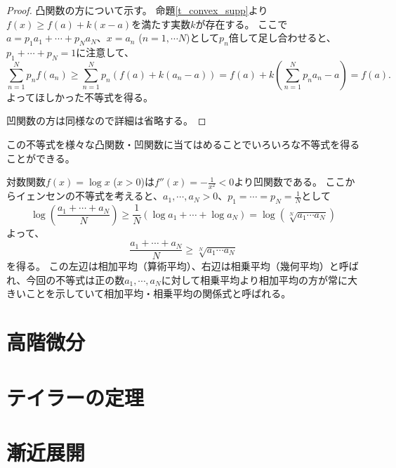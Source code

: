 \begin{proof}
凸関数の方について示す。
命題\ref{t_convex_supp}より$f(x) \ge f(a)+k(x-a)$を満たす実数$k$が存在する。
ここで$a = p_1 a_1+\cdots+p_N a_N$、$x = a_n$ ($n = 1, \cdots N$)として$p_n$倍して足し合わせると、$p_1+\cdots+p_N = 1$に注意して、
$$
\sum_{n = 1}^N p_n f(a_n) \ge \sum_{n = 1}^N p_n(f(a)+k(a_n-a)) = f(a)+k(\sum_{n = 1}^N p_n a_n-a) = f(a).
$$
よってほしかった不等式を得る。

凹関数の方は同様なので詳細は省略する。
\end{proof}

この不等式を様々な凸関数・凹関数に当てはめることでいろいろな不等式を得ることができる。

\begin{example}
対数関数$f(x) = \log x$ ($x > 0$)は$f''(x) = -\frac{1}{x^2} < 0$より凹関数である。
ここからイェンセンの不等式を考えると、$a_1, \cdots, a_N > 0$、$p_1 = \cdots = p_N = \frac{1}{N}$として
$$
\log(\frac{a_1+\cdots+a_N}{N}) \ge \frac{1}{N}(\log a_1+\cdots+\log a_N) = \log(\sqrt[N]{a_1\cdots a_N})
$$
よって、
$$
\frac{a_1+\cdots+a_N}{N} \ge \sqrt[N]{a_1\cdots a_N}
$$
を得る。
この左辺は相加平均（算術平均）、右辺は相乗平均（幾何平均）と呼ばれ、今回の不等式は正の数$a_1, \cdots, a_N$に対して相乗平均より相加平均の方が常に大きいことを示していて相加平均・相乗平均の関係式と呼ばれる。
\end{example}

\section{高階微分}

\section{テイラーの定理}

\section{漸近展開}
